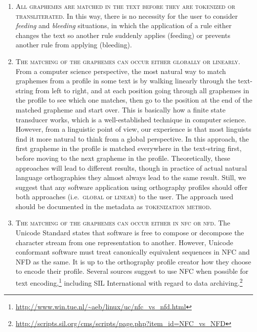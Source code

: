 \begin{enumerate}
	\def\labelenumi{B\arabic{enumi}.} \setcounter{enumi}{4} 
	\item \textsc{All graphemes are matched in the text before they are tokenized
       or transliterated}. In this way, there is no necessity for the user to
       consider \textit{feeding} and \textit{bleeding} situations, in which the application of
       a rule either changes the text so another rule suddenly applies (feeding)
       or prevents another rule from applying (bleeding). 
	\item \textsc{The matching of the graphemes can occur either globally or
       linearly.} From a computer science perspective, the most natural way to
       match graphemes from a profile in some text is by walking linearly
       through the text-string from left to right, and at each position going
       through all graphemes in the profile to see which one matches, then go to
       the position at the end of the matched grapheme and start over. This is
       basically how a finite state transducer works, which is a
       well-established technique in computer science. However, from a
       linguistic point of view, our experience is that most linguists find it
       more natural to think from a global perspective. In this approach, the
       first grapheme in the profile is matched everywhere in the text-string
       first, before moving to the next grapheme in the profile. Theoretically,
       these approaches will lead to different results, though in practice of
       actual natural language orthographies they almost always lead to the same
       result. Still, we suggest that any software application using orthography
       profiles should offer both approaches (i.e.\ \textsc{global} or
       \textsc{linear}) to the user. The approach used should be documented in
       the metadata as \textsc{tokenization method}. 
	\item \textsc{The matching of the graphemes can occur either in nfc or nfd.} 
	   The Unicode Standard states that software is free to compose or decompose the character stream from one 
	   representation to another. However, Unicode conformant software must treat canonically equivalent sequences in 
	   NFC and NFD as the same. It is up to the orthography profile creator how they choose to encode their profile. 
	   Several sources suggest to use NFC when possible for text encoding,\footnote{\url{http://www.win.tue.nl/~aeb/linux/uc/nfc_vs_nfd.html}} 
	   including SIL International with regard to data archiving.\footnote{\url{http://scripts.sil.org/cms/scripts/page.php?item_id=NFC_vs_NFD}} 

\end{enumerate}

